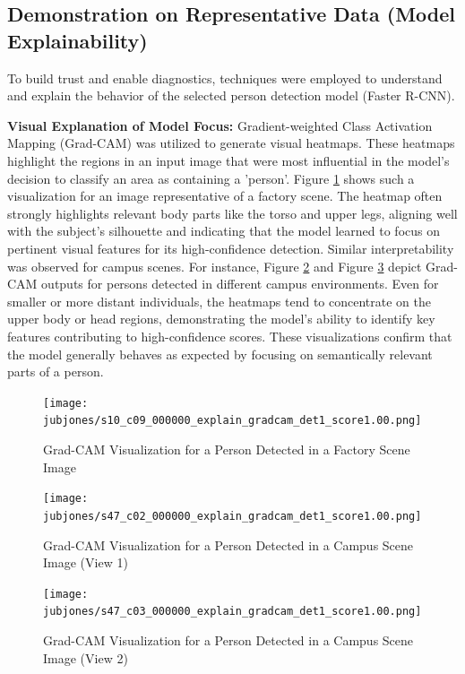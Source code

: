 \subsection{Demonstration on Representative Data (Model Explainability)}
\label{subsection:model_demo_explain_new}
To build trust and enable diagnostics, techniques were employed to understand and explain the behavior of the selected person detection model (Faster R-CNN).

\textbf{Visual Explanation of Model Focus:}
Gradient-weighted Class Activation Mapping (Grad-CAM) was utilized to generate visual heatmaps. These heatmaps highlight the regions in an input image that were most influential in the model's decision to classify an area as containing a 'person'. Figure \ref{fig:gradcam_example1} shows such a visualization for an image representative of a factory scene. The heatmap often strongly highlights relevant body parts like the torso and upper legs, aligning well with the subject's silhouette and indicating that the model learned to focus on pertinent visual features for its high-confidence detection. Similar interpretability was observed for campus scenes. For instance, Figure \ref{fig:gradcam_example2} and Figure \ref{fig:gradcam_example3} depict Grad-CAM outputs for persons detected in different campus environments. Even for smaller or more distant individuals, the heatmaps tend to concentrate on the upper body or head regions, demonstrating the model's ability to identify key features contributing to high-confidence scores. These visualizations confirm that the model generally behaves as expected by focusing on semantically relevant parts of a person.

\begin{figure}[!htb]
    \centering
    \texttt{[image: jubjones/s10\_c09\_000000\_explain\_gradcam\_det1\_score1.00.png]}
    \caption{Grad-CAM Visualization for a Person Detected in a Factory Scene Image}
    \label{fig:gradcam_example1}
\end{figure}

\begin{figure}[!htb]
    \centering
    \texttt{[image: jubjones/s47\_c02\_000000\_explain\_gradcam\_det1\_score1.00.png]}
    \caption{Grad-CAM Visualization for a Person Detected in a Campus Scene Image (View 1)}
    \label{fig:gradcam_example2}
\end{figure}

\begin{figure}[!htb]
    \centering
    \texttt{[image: jubjones/s47\_c03\_000000\_explain\_gradcam\_det1\_score1.00.png]}
    \caption{Grad-CAM Visualization for a Person Detected in a Campus Scene Image (View 2)}
    \label{fig:gradcam_example3}
\end{figure}
\clearpage


